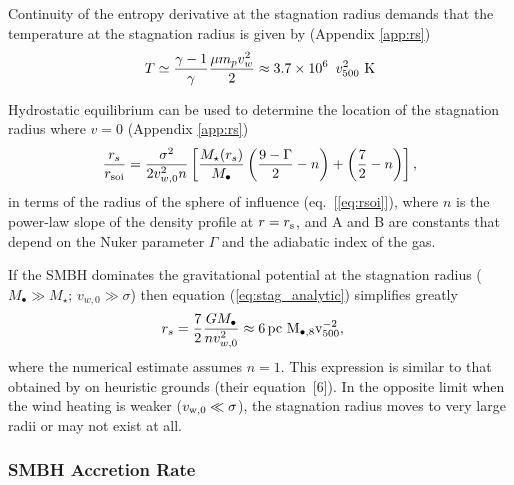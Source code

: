 \documentclass[usenatbib,fleqn]{mn2e}
\newcommand{\rs}{r_s}
\newcommand{\pc}{\rm pc}
\newcommand{\Mstar}{M_{\star}}
\newcommand{\Mbh}[1][]{M_{\bullet#1}}
\newcommand{\Mbheight}{M_{\bullet,8}}
\newcommand{\soi}{\rm soi}
\newcommand{\rsoi}{r_{\soi}}
\newcommand{\vwO}{v_{w,0}}
\begin{document}
Continuity of the entropy derivative at the stagnation radius demands that the temperature at the stagnation radius is given by (Appendix \ref{app:rs})
\begin{align}
T \simeq \frac{\gamma-1}{\gamma}\frac{\mu m_p v_{w}^{2}}{2} \approx 3.7
\times 10^6\ \, v_{500}^2 \,\,{\rm K} 
\label{eq:Tanalytic}
\end{align}

Hydrostatic equilibrium can be used to determine the location of the stagnation radius where $v = 0$ (Appendix \ref{app:rs})
\begin{align}
  \frac{\rs}{\rsoi}=\frac{\sigma^{2}}{2 v_{w,0}^{2} n}\left[
   \frac{\Mstar(\rs)}{\Mbh}\left(\frac{9-\Gamma}{2}-n\right)+\left(\frac{7}{2}-n\right)\right],
 \label{eq:stag_analytic}
\end{align}
in terms of the radius of the sphere of influence (eq.~[\ref{eq:rsoi}]), where $n$ is the power-law slope of the
density profile at $r = r_{\rm s}$, and A and B are constants that depend on the Nuker
parameter $\Gamma$ and the adiabatic index of the gas.

If the SMBH dominates the gravitational potential at the stagnation radius ($M_{\bullet} \gg M_{\star}$; $v_{w,0} \gg \sigma$) then equation (\ref{eq:stag_analytic}) simplifies greatly
\begin{align}
  &\rs=\frac{7}{2}\frac{G \Mbh}{n \vwO^2} \approx 6
 \, \pc \,\, \Mbheight v_{500}^{-2},
  \label{eq:stag_simple}
\end{align}
where the numerical estimate assumes $n = 1$.  This expression is similar to that obtained by \citet{Volonteri+11} on heuristic grounds (their equation~[6]).  In the opposite limit when the wind heating is weaker ($v_{\rm w,0} \ll \sigma$), the stagnation radius moves to very large radii or may not exist at all.  

\subsubsection{SMBH Accretion Rate}
\end{document}
